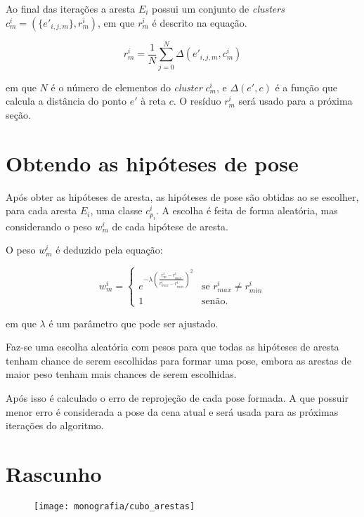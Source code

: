 Ao final das iterações a aresta $E_i$ possui um conjunto de \emph{clusters} $c^i_m = (\{e'_{i,j,m}\}, r^i_m)$, em que $r^i_m$ é descrito na equação.

\begin{equation}
r^i_m = \frac{1}{N} \sum^{N}_{j = 0} \Delta (e'_{i,j,m}, c^i_m)
\end{equation}

em que $N$ é o número de elementos do \emph{cluster} $c^i_m$, e $\Delta (e', c)$ é a função que calcula a distância do ponto $e'$ à reta $c$. O resíduo $r^i_m$ será usado para a próxima seção.

\section{Obtendo as hipóteses de pose}

Após obter as hipóteses de aresta, as hipóteses de pose são obtidas ao se escolher, para cada aresta $E_i$, uma classe $c^i_{p_i}$. A escolha é feita de forma aleatória, mas considerando o peso $w^i_m$ de cada hipótese de aresta.

O peso $w^i_m$ é deduzido pela equação:

\begin{equation}
w^i_m = \begin{cases}
    e^{-\lambda \left( \frac{r^i_m - r^i_{min}}{r^i_{max} - r^i_{min}}\right)^2 } & \mbox{se } r^i_{max} \neq r^i_{min} \\
    1 & \mbox{senão}.
\end{cases}
\end{equation}

em que $\lambda$ é um parâmetro que pode ser ajustado.

Faz-se uma escolha aleatória com pesos para que todas as hipóteses de aresta tenham chance de serem escolhidas para formar uma pose, embora as arestas de maior peso tenham mais chances de serem escolhidas.

Após isso é calculado o erro de reprojeção de cada pose formada. A que possuir menor erro é considerada a pose da cena atual e será usada para as próximas iterações do algoritmo.

\section{Rascunho}

\begin{figure}[ht!]
\centering
\texttt{[image: monografia/cubo\_arestas]}
\caption{}
\label{cubo_arestas}
\end{figure}

